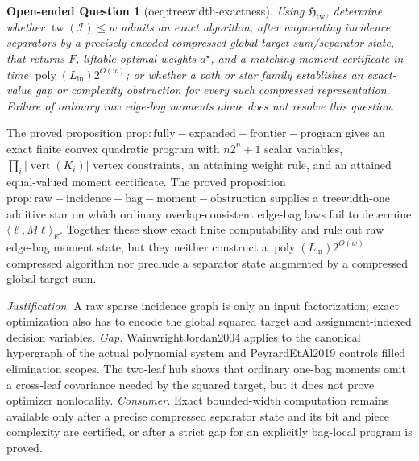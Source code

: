 \documentclass{article}
\newtheorem{openendedquestion}{Open-ended Question}
\begin{document}
\begin{openendedquestion}[oeq:treewidth-exactness]\label{oeq:treewidth-exactness}
Using \(\mathfrak H_{\mathrm{tw}}\), determine whether \(\operatorname{tw}(\mathcal I)\le w\) admits an exact algorithm, after augmenting incidence separators by a precisely encoded compressed global target-sum/separator state, that returns \(F\), liftable optimal weights \(a^{\star}\), and a matching moment certificate in time \(\operatorname{poly}(L_{\mathrm{in}})2^{O(w)}\); or whether a path or star family establishes an exact-value gap or complexity obstruction for every such compressed representation. Failure of ordinary raw edge-bag moments alone does not resolve this question.
\end{openendedquestion}
The proved proposition \(\mathrm{prop:fully-expanded-frontier-program}\) gives an exact finite convex quadratic program with \(n2^n+1\) scalar variables, \(\prod_i|\operatorname{vert}(K_i)|\) vertex constraints, an attaining weight rule, and an attained equal-valued moment certificate.  The proved proposition \(\mathrm{prop:raw-incidence-bag-moment-obstruction}\) supplies a treewidth-one additive star on which ordinary overlap-consistent edge-bag laws fail to determine \(\langle\ell,M\ell\rangle_E\).  Together these show exact finite computability and rule out raw edge-bag moment state, but they neither construct a \(\operatorname{poly}(L_{\mathrm{in}})2^{O(w)}\) compressed algorithm nor preclude a separator state augmented by a compressed global target sum.
\par\smallskip\noindent \textit{Justification.} A raw sparse incidence graph is only an input factorization; exact optimization also has to encode the global squared target and assignment-indexed decision variables. \textit{Gap.} WainwrightJordan2004 applies to the canonical hypergraph of the actual polynomial system and PeyrardEtAl2019 controls filled elimination scopes. The two-leaf hub shows that ordinary one-bag moments omit a cross-leaf covariance needed by the squared target, but it does not prove optimizer nonlocality. \textit{Consumer.} Exact bounded-width computation remains available only after a precise compressed separator state and its bit and piece complexity are certified, or after a strict gap for an explicitly bag-local program is proved.
\end{document}
